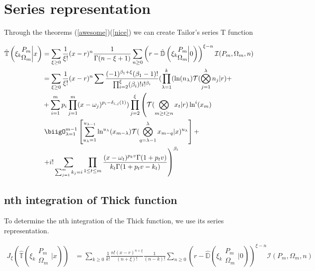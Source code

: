 \section{Series representation}

Through the theorems (\ref{awesome})(\ref{nice}) we can create Tailor's series T function

\begin{align}
      \hat{\mathbb{T}}\left( \xi_k \begin{matrix} P_m \\ \Omega_m \end{matrix}
      \bigg| x  \right)&= \sum_{\xi \geq 0} \frac{1}{\xi!} (x-r)^n\frac{1}{
      \Gamma(n-\xi+1)}\sum_{n \geq 0}\left(r- \hat{\mathbb{D}}\left( \xi_k 
      \begin{matrix} P_m \\ \Omega_m \end{matrix} \bigg| 0 \right)\right)^{\xi-n}
      \mathcal{I}(P_m, \Omega_m, n) \\
      & = \sum_{\xi \geq 0} \frac{1}{\xi!} (x-r)^n\sum \frac{(-1)^{\beta_1 + \xi}
      (\beta_1 -1)!}{\prod_{i=2}^\xi (\beta_i)!i!^{\beta_i}} (\prod_{\lambda = 1}^k
      (\ln(n_\lambda) \mathcal{T}(\bigotimes_{j=1}^\lambda n_j |r) + \\
      &+\sum_{i=1}^m p_i \prod_{j=1}^m (x-\omega_j)^{p_i-\delta_{i, j}(1)} )\prod_{j=2}^\xi
      \left(\mathcal{T}(\bigotimes_{m \geq t \geq n}x_t| r) \ln^i (x_m) \right.\\
      &\left. \biigO_{\lambda = 1}^{m-1} \left[\sum_{u_{\lambda}=1}^{u_{\lambda-1}}
      \ln^{u_{\lambda}}(x_{m-\lambda}) \mathcal{T}(\bigotimes_{q = \lambda-1}^\lambda x_{m-q}
      |x)^{u_{\lambda}} \right] + \right.\\
      &\left.+ i! \sum_{\sum_{j=1}^m k_j = i}\prod_{1 \leq t \leq m} \frac{(x - \omega_t)^{p_k v}
      \Gamma(1+p_t v)}{k_t\Gamma(1+p_t v - k_t)}\right)^{\beta_i}
      \label{q}
\end{align}

\subsection{nth integration of Thick function}

To determine the nth integration of the Thick function, we use 
its series representation.

\begin{align}
      J_\xi\left( \hat{\mathbb{T}}\left( \xi_k \begin{matrix} P_m \\ \Omega_m \end{matrix} 
      \bigg| x  \right)\right)&= \sum_{k \geq 0} \frac{1}{k!} \frac{n!(x-r)^{n+\xi}}{(n+\xi)!}
      \frac{1}{(n-k)!}\sum_{n \geq 0}\left(r- \hat{\mathbb{D}}\left( \xi_k \begin{matrix} P_m \\
      \Omega_m \end{matrix} \bigg| 0 \right)\right)^{\xi-n} \mathcal{I}(P_m, \Omega_m, n)
\end{align}

